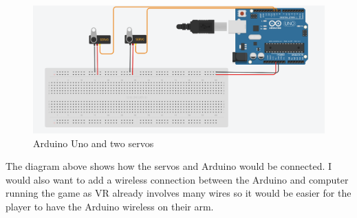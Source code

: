 \documentclass{scrartcl}
\begin{document}
\begin{figure}[h]
	\includegraphics[width=1.0\linewidth]{arduino_diagram.png}
	\caption{ Arduino Uno and two servos }
\end{figure} 
The diagram above shows how the servos and Arduino would be connected. I would also want to add a wireless connection between the Arduino and computer running the game as VR already involves many wires so it would be easier for the player to have the Arduino wireless on their arm. 

\bigskip




	
\end{document}
